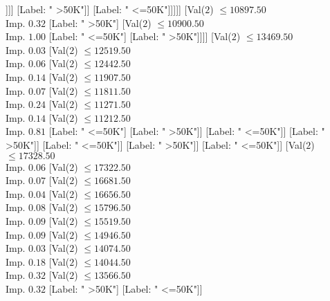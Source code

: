 \documentclass[margin=10pt]{standalone}
\begin{document}
\begin{forest}
																					[Label: " <=50K"]
																					[Val($2$) $ \leq 10136.50$ \\ Imp. $0.25$
																						[Label: " >50K"]
																						[Label: " <=50K"]]]]
																			[Label: " >50K"]]
																		[Label: " <=50K"]]]]]
														[Val($2$) $ \leq 10897.50$ \\ Imp. $0.32$
															[Label: " >50K"]
															[Val($2$) $ \leq 10900.50$ \\ Imp. $1.00$
																[Label: " <=50K"]
																[Label: " >50K"]]]]
													[Val($2$) $ \leq 13469.50$ \\ Imp. $0.03$
														[Val($2$) $ \leq 12519.50$ \\ Imp. $0.06$
															[Val($2$) $ \leq 12442.50$ \\ Imp. $0.14$
																[Val($2$) $ \leq 11907.50$ \\ Imp. $0.07$
																	[Val($2$) $ \leq 11811.50$ \\ Imp. $0.24$
																		[Val($2$) $ \leq 11271.50$ \\ Imp. $0.14$
																			[Val($2$) $ \leq 11212.50$ \\ Imp. $0.81$
																				[Label: " <=50K"]
																				[Label: " >50K"]]
																			[Label: " <=50K"]]
																		[Label: " >50K"]]
																	[Label: " <=50K"]]
																[Label: " >50K"]]
															[Label: " <=50K"]]
														[Val($2$) $ \leq 17328.50$ \\ Imp. $0.06$
															[Val($2$) $ \leq 17322.50$ \\ Imp. $0.07$
																[Val($2$) $ \leq 16681.50$ \\ Imp. $0.04$
																	[Val($2$) $ \leq 16656.50$ \\ Imp. $0.08$
																		[Val($2$) $ \leq 15796.50$ \\ Imp. $0.09$
																			[Val($2$) $ \leq 15519.50$ \\ Imp. $0.09$
																				[Val($2$) $ \leq 14946.50$ \\ Imp. $0.03$
																					[Val($2$) $ \leq 14074.50$ \\ Imp. $0.18$
																						[Val($2$) $ \leq 14044.50$ \\ Imp. $0.32$
																							[Val($2$) $ \leq 13566.50$ \\ Imp. $0.32$
																								[Label: " >50K"]
																								[Label: " <=50K"]]

\end{forest}
\end{document}
